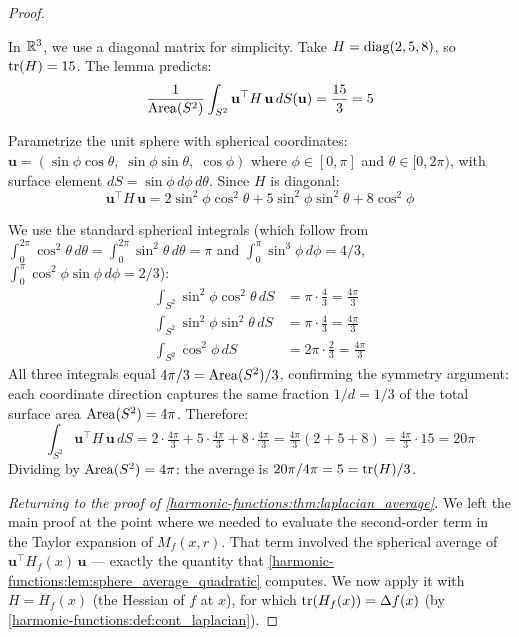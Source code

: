 \begin{notechapter}
\begin{proof}
\begin{example}
In $\mathbb{R}^3$, we use a diagonal matrix for simplicity. Take
$H = \operatorname{diag}(2, 5, 8)$, so $\operatorname{tr}(H) = 15$. The lemma predicts:
\[
\frac{1}{\operatorname{Area}(S^2)}\int_{S^2}
  \mathbf{u}^\top H\,\mathbf{u}\,dS(\mathbf{u})
= \frac{15}{3} = 5
\]

Parametrize the unit sphere with spherical coordinates:
$\mathbf{u} = (\sin\phi\cos\theta,\;\sin\phi\sin\theta,\;\cos\phi)$
where $\phi \in [0,\pi]$ and $\theta \in [0,2\pi)$, with surface element
$dS = \sin\phi\,d\phi\,d\theta$. Since $H$ is diagonal:
\[
\mathbf{u}^\top H\,\mathbf{u}
= 2\sin^2\!\phi\cos^2\!\theta
+ 5\sin^2\!\phi\sin^2\!\theta
+ 8\cos^2\!\phi
\]

We use the standard spherical integrals (which follow from
$\int_0^{2\pi}\cos^2\!\theta\,d\theta
= \int_0^{2\pi}\sin^2\!\theta\,d\theta = \pi$ and
$\int_0^{\pi}\sin^3\!\phi\,d\phi = 4/3$,
$\int_0^{\pi}\cos^2\!\phi\sin\phi\,d\phi = 2/3$):
\begin{align}
\int_{S^2}\sin^2\!\phi\cos^2\!\theta\,dS
&= \pi \cdot \tfrac{4}{3} = \tfrac{4\pi}{3} \\
\int_{S^2}\sin^2\!\phi\sin^2\!\theta\,dS
&= \pi \cdot \tfrac{4}{3} = \tfrac{4\pi}{3} \\
\int_{S^2}\cos^2\!\phi\,dS
&= 2\pi \cdot \tfrac{2}{3} = \tfrac{4\pi}{3}
\end{align}
All three integrals equal $4\pi/3 = \operatorname{Area}(S^2)/3$, confirming the symmetry
argument: each coordinate direction captures the same fraction $1/d = 1/3$
of the total surface area $\operatorname{Area}(S^2) = 4\pi$. Therefore:
\[
\int_{S^2} \mathbf{u}^\top H\,\mathbf{u}\,dS
= 2 \cdot \tfrac{4\pi}{3} + 5 \cdot \tfrac{4\pi}{3}
  + 8 \cdot \tfrac{4\pi}{3}
= \tfrac{4\pi}{3}(2 + 5 + 8)
= \tfrac{4\pi}{3}\cdot 15 = 20\pi
\]
Dividing by $\operatorname{Area}(S^2) = 4\pi$: the average is $20\pi / 4\pi = 5 =
\operatorname{tr}(H)/3$.
\end{example}

\medskip
\noindent\emph{Returning to the proof of
\cref{harmonic-functions:thm:laplacian_average}.} We left the main proof at the point
where we needed to evaluate the second-order term in the Taylor expansion of
$M_f(x,r)$. That term involved the spherical average of
$\mathbf{u}^\top H_f(x)\,\mathbf{u}$ --- exactly the quantity that
\cref{harmonic-functions:lem:sphere_average_quadratic} computes. We now apply it with
$H = H_f(x)$ (the Hessian of $f$ at $x$), for which
$\operatorname{tr}(H_f(x)) = \Delta f(x)$ (by \cref{harmonic-functions:def:cont_laplacian}).


\end{proof}
\end{notechapter}
